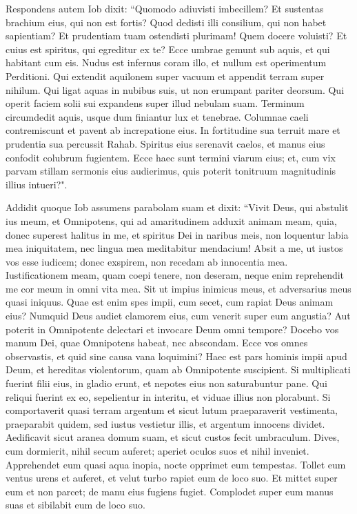 \begin{biblechapter}  
\verse Respondens autem Iob dixit: 
\verse “Quomodo adiuvisti imbecillem? Et sustentas brachium eius, qui non est fortis? 
\verse Quod dedisti illi consilium, qui non habet sapientiam? Et prudentiam tuam ostendisti plurimam! 
\verse Quem docere voluisti? Et cuius est spiritus, qui egreditur ex te? 
\verse Ecce umbrae gemunt sub aquis, et qui habitant cum eis. 
\verse Nudus est infernus coram illo, et nullum est operimentum Perditioni. 
\verse Qui extendit aquilonem super vacuum et appendit terram super nihilum. 
\verse Qui ligat aquas in nubibus suis, ut non erumpant pariter deorsum. 
\verse Qui operit faciem solii sui expandens super illud nebulam suam. 
\verse Terminum circumdedit aquis, usque dum finiantur lux et tenebrae. 
\verse Columnae caeli contremiscunt et pavent ab increpatione eius. 
\verse In fortitudine sua terruit mare et prudentia sua percussit Rahab. 
\verse Spiritus eius serenavit caelos, et manus eius confodit colubrum fugientem. 
\verse Ecce haec sunt termini viarum eius; et, cum vix parvam stillam sermonis eius audierimus, quis poterit tonitruum magnitudinis illius intueri?". 
\end{biblechapter}

\begin{biblechapter}  
\verse Addidit quoque Iob assumens parabolam suam et dixit: 
\verse “Vivit Deus, qui abstulit ius meum, et Omnipotens, qui ad amaritudinem adduxit animam meam, 
\verse quia, donec superest halitus in me, et spiritus Dei in naribus meis, 
\verse non loquentur labia mea iniquitatem, nec lingua mea meditabitur mendacium! 
\verse Absit a me, ut iustos vos esse iudicem; donec exspirem, non recedam ab innocentia mea. 
\verse Iustificationem meam, quam coepi tenere, non deseram, neque enim reprehendit me cor meum in omni vita mea. 
\verse Sit ut impius inimicus meus, et adversarius meus quasi iniquus. 
\verse Quae est enim spes impii, cum secet, cum rapiat Deus animam eius? 
\verse Numquid Deus audiet clamorem eius, cum venerit super eum angustia? 
\verse Aut poterit in Omnipotente delectari et invocare Deum omni tempore? 
\verse Docebo vos manum Dei, quae Omnipotens habeat, nec abscondam. 
\verse Ecce vos omnes observastis, et quid sine causa vana loquimini? 
\verse Haec est pars hominis impii apud Deum, et hereditas violentorum, quam ab Omnipotente suscipient. 
\verse Si multiplicati fuerint filii eius, in gladio erunt, et nepotes eius non saturabuntur pane. 
\verse Qui reliqui fuerint ex eo, sepelientur in interitu, et viduae illius non plorabunt. 
\verse Si comportaverit quasi terram argentum et sicut lutum praeparaverit vestimenta, 
\verse praeparabit quidem, sed iustus vestietur illis, et argentum innocens dividet. 
\verse Aedificavit sicut aranea domum suam, et sicut custos fecit umbraculum. 
\verse Dives, cum dormierit, nihil secum auferet; aperiet oculos suos et nihil inveniet. 
\verse Apprehendet eum quasi aqua inopia, nocte opprimet eum tempestas. 
\verse Tollet eum ventus urens et auferet, et velut turbo rapiet eum de loco suo. 
\verse Et mittet super eum et non parcet; de manu eius fugiens fugiet. 
\verse Complodet super eum manus suas et sibilabit eum de loco suo. 
\end{biblechapter}

